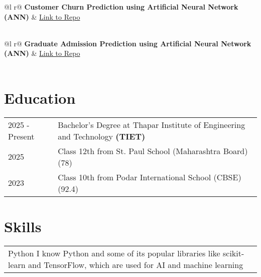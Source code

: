 \documentclass[a4paper,12pt]{article}
\begin{document}
\begin{tabularx}{\linewidth}{ @{}l r@{} }
\textbf{Customer Churn Prediction using Artificial Neural Network (ANN)} & \hfill \href{https://github.com/LakshThakre/DeepLearning}{Link to Repo} \\[3.75pt]
  \\
\end{tabularx}

\begin{tabularx}{\linewidth}{ @{}l r@{} }
\textbf{Graduate Admission Prediction using Artificial Neural Network (ANN)} & \hfill \href{https://github.com/LakshThakre/DeepLearning}{Link to Repo} \\[3.75pt]
  \\
\end{tabularx}

\section{Education}
\begin{tabularx}{\linewidth}{@{}l X@{}}
2025 - Present & Bachelor's Degree at Thapar Institute of Engineering and Technology \textbf{(TIET)}\\ 

2025 & Class 12th from St. Paul School (Maharashtra Board) \hfill  (78) \\

2023 & Class 10th from Podar International School (CBSE) \hfill  (92.4) \\
\end{tabularx}

\section{Skills}
\begin{tabularx}{\linewidth}{@{}l X@{}}
Python \normalsize{I know Python and some of its popular libraries like scikit-learn and TensorFlow, which are used for AI and machine learning}\\
\end{tabularx}

\vfill
{}
\end{document}
